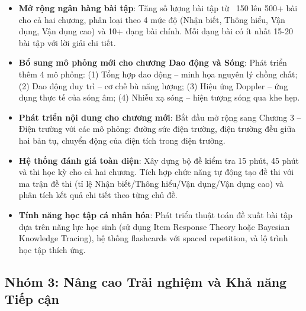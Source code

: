 \begin{itemize}
    \item \textbf{Mở rộng ngân hàng bài tập}: Tăng số lượng bài tập từ ~150 lên 500+ bài cho cả hai chương, phân loại theo 4 mức độ (Nhận biết, Thông hiểu, Vận dụng, Vận dụng cao) và 10+ dạng bài chính. Mỗi dạng bài có ít nhất 15-20 bài tập với lời giải chi tiết.
    
    \item \textbf{Bổ sung mô phỏng mới cho chương Dao động và Sóng}: Phát triển thêm 4 mô phỏng: (1) Tổng hợp dao động – minh họa nguyên lý chồng chất; (2) Dao động duy trì – cơ chế bù năng lượng; (3) Hiệu ứng Doppler – ứng dụng thực tế của sóng âm; (4) Nhiễu xạ sóng – hiện tượng sóng qua khe hẹp.
    
    \item \textbf{Phát triển nội dung cho chương mới}: Bắt đầu mở rộng sang Chương 3 – Điện trường với các mô phỏng: đường sức điện trường, điện trường đều giữa hai bản tụ, chuyển động của điện tích trong điện trường.
    
    \item \textbf{Hệ thống đánh giá toàn diện}: Xây dựng bộ đề kiểm tra 15 phút, 45 phút và thi học kỳ cho cả hai chương. Tích hợp chức năng tự động tạo đề thi với ma trận đề thi (tỉ lệ Nhận biết/Thông hiểu/Vận dụng/Vận dụng cao) và phân tích kết quả chi tiết theo từng chủ đề.
    
    \item \textbf{Tính năng học tập cá nhân hóa}: Phát triển thuật toán đề xuất bài tập dựa trên năng lực học sinh (sử dụng Item Response Theory hoặc Bayesian Knowledge Tracing), hệ thống flashcards với spaced repetition, và lộ trình học tập thích ứng.
\end{itemize}

\subsection{Nhóm 3: Nâng cao Trải nghiệm và Khả năng Tiếp cận}

